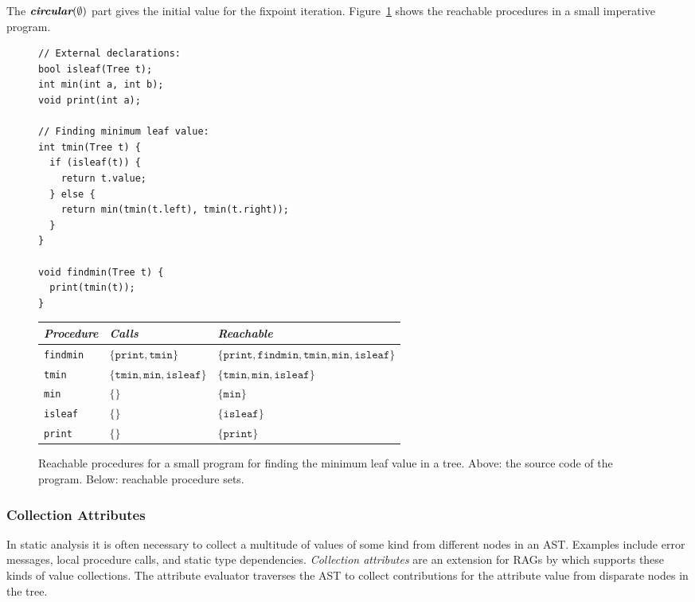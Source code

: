 \documentclass[10pt, twoside, openright]{book}
\newcommand{\figref}[1]{Figure~\ref{#1}}
\begin{document}
\noindent
The $\textit{\textbf{circular}}(\emptyset)$ part gives the initial value for the fixpoint iteration.
\figref{fig:reachable} shows the reachable procedures in a small imperative program.

\begin{figure}
  \centering
\begin{lstlisting}
// External declarations:
bool isleaf(Tree t);
int min(int a, int b);
void print(int a);

// Finding minimum leaf value:
int tmin(Tree t) {
  if (isleaf(t)) {
    return t.value;
  } else {
    return min(tmin(t.left), tmin(t.right));
  }
}

void findmin(Tree t) {
  print(tmin(t));
}
\end{lstlisting}
\begin{tabular}{lll}
\toprule
\emph{Procedure} & \emph{Calls} & \emph{Reachable} \\
\midrule
\texttt{findmin} & $\{ \texttt{print}, \texttt{tmin} \}$ & $\{ \texttt{print}, \texttt{findmin}, \texttt{tmin}, \texttt{min}, \texttt{isleaf} \}$\\
\texttt{tmin} & $\{ \texttt{tmin}, \texttt{min}, \texttt{isleaf} \}$ & $\{ \texttt{tmin}, \texttt{min}, \texttt{isleaf} \}$\\
\texttt{min} & $\{\}$ & $\{ \texttt{min} \}$\\
\texttt{isleaf} & $\{\}$ & $\{ \texttt{isleaf} \}$\\
\texttt{print} & $\{\}$ & $\{ \texttt{print} \}$\\
\bottomrule
\end{tabular}
\caption{Reachable procedures for a small program for finding the minimum leaf value in a tree.
Above: the source code of the program.
Below: reachable procedure sets.
}
\label{fig:reachable}
\end{figure}



\subsubsection{Collection Attributes}

In static analysis it is often necessary to 
collect a multitude of values of some kind from different
nodes in an AST. Examples include error messages, local procedure calls, and static type
dependencies.  \emph{Collection attributes} are an extension for RAGs by
\textcite{DBLP:conf/scam/MagnussonEH07} which
supports these kinds of value collections.
The attribute evaluator traverses the AST to collect contributions for
the attribute value from disparate nodes in the tree.
\end{document}
